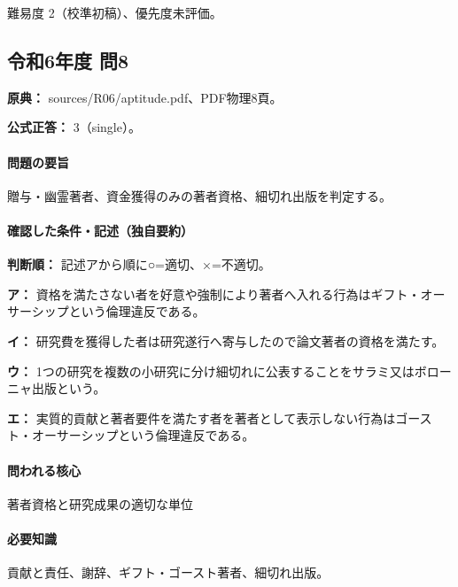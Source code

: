 \par 難易度 2（校準初稿）、優先度未評価。

\subsection{令和6年度 問8}
\label{q:r06-reg-apt-08}

\noindent\textbf{原典：} sources/R06/aptitude.pdf、PDF物理8頁。

\textbf{公式正答：} 3（single）。

\paragraph{問題の要旨} 贈与・幽霊著者、資金獲得のみの著者資格、細切れ出版を判定する。

\paragraph{確認した条件・記述（独自要約）}\mbox{}\par

\noindent\textbf{判断順：} 記述アから順に○=適切、×=不適切。\par

\noindent\textbf{ア：} 資格を満たさない者を好意や強制により著者へ入れる行為はギフト・オーサーシップという倫理違反である。\par

\noindent\textbf{イ：} 研究費を獲得した者は研究遂行へ寄与したので論文著者の資格を満たす。\par

\noindent\textbf{ウ：} 1つの研究を複数の小研究に分け細切れに公表することをサラミ又はボローニャ出版という。\par

\noindent\textbf{エ：} 実質的貢献と著者要件を満たす者を著者として表示しない行為はゴースト・オーサーシップという倫理違反である。\par

\paragraph{問われる核心} 著者資格と研究成果の適切な単位

\paragraph{必要知識} 貢献と責任、謝辞、ギフト・ゴースト著者、細切れ出版。

